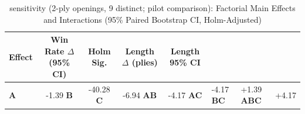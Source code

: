 \begin{table}[htbp]
\centering
\caption{sensitivity (2-ply openings, 9 distinct; pilot comparison): Factorial Main Effects and Interactions (95\% Paired Bootstrap CI, Holm-Adjusted)}
\label{tab:factorial_effects}
\begin{tabular}{lcccc}
\toprule
Effect & Win Rate $\Delta$ (95\% CI) & Holm Sig. & Length $\Delta$ (plies) & Length 95\% CI \\
\midrule
\textbf{A} & -1.39%
\textbf{B} & -40.28%
\textbf{C} & -6.94%
\textbf{AB} & -4.17%
\textbf{AC} & -4.17%
\textbf{BC} & +1.39%
\textbf{ABC} & +4.17%
\bottomrule
\end{tabular}
\end{table}
